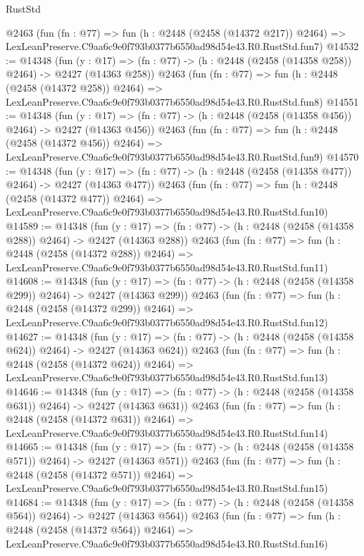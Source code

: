 \begin{lexlean}{RustStd}
\begin{coremodule}
    @2463
    (fun (fn : @77) =>
    fun (h : @2448 (@2458 (@14372 @217)) @2464) =>
    LexLeanPreserve.C9aa6c9e0f793b0377b6550ad98d54e43.R0.RustStd.fun7)
@14532 := @14348
    (fun (y : @17) => (fn : @77) -> (h : @2448 (@2458 (@14358 @258)) @2464) -> @2427 (@14363 @258))
    @2463
    (fun (fn : @77) =>
    fun (h : @2448 (@2458 (@14372 @258)) @2464) =>
    LexLeanPreserve.C9aa6c9e0f793b0377b6550ad98d54e43.R0.RustStd.fun8)
@14551 := @14348
    (fun (y : @17) => (fn : @77) -> (h : @2448 (@2458 (@14358 @456)) @2464) -> @2427 (@14363 @456))
    @2463
    (fun (fn : @77) =>
    fun (h : @2448 (@2458 (@14372 @456)) @2464) =>
    LexLeanPreserve.C9aa6c9e0f793b0377b6550ad98d54e43.R0.RustStd.fun9)
@14570 := @14348
    (fun (y : @17) => (fn : @77) -> (h : @2448 (@2458 (@14358 @477)) @2464) -> @2427 (@14363 @477))
    @2463
    (fun (fn : @77) =>
    fun (h : @2448 (@2458 (@14372 @477)) @2464) =>
    LexLeanPreserve.C9aa6c9e0f793b0377b6550ad98d54e43.R0.RustStd.fun10)
@14589 := @14348
    (fun (y : @17) => (fn : @77) -> (h : @2448 (@2458 (@14358 @288)) @2464) -> @2427 (@14363 @288))
    @2463
    (fun (fn : @77) =>
    fun (h : @2448 (@2458 (@14372 @288)) @2464) =>
    LexLeanPreserve.C9aa6c9e0f793b0377b6550ad98d54e43.R0.RustStd.fun11)
@14608 := @14348
    (fun (y : @17) => (fn : @77) -> (h : @2448 (@2458 (@14358 @299)) @2464) -> @2427 (@14363 @299))
    @2463
    (fun (fn : @77) =>
    fun (h : @2448 (@2458 (@14372 @299)) @2464) =>
    LexLeanPreserve.C9aa6c9e0f793b0377b6550ad98d54e43.R0.RustStd.fun12)
@14627 := @14348
    (fun (y : @17) => (fn : @77) -> (h : @2448 (@2458 (@14358 @624)) @2464) -> @2427 (@14363 @624))
    @2463
    (fun (fn : @77) =>
    fun (h : @2448 (@2458 (@14372 @624)) @2464) =>
    LexLeanPreserve.C9aa6c9e0f793b0377b6550ad98d54e43.R0.RustStd.fun13)
@14646 := @14348
    (fun (y : @17) => (fn : @77) -> (h : @2448 (@2458 (@14358 @631)) @2464) -> @2427 (@14363 @631))
    @2463
    (fun (fn : @77) =>
    fun (h : @2448 (@2458 (@14372 @631)) @2464) =>
    LexLeanPreserve.C9aa6c9e0f793b0377b6550ad98d54e43.R0.RustStd.fun14)
@14665 := @14348
    (fun (y : @17) => (fn : @77) -> (h : @2448 (@2458 (@14358 @571)) @2464) -> @2427 (@14363 @571))
    @2463
    (fun (fn : @77) =>
    fun (h : @2448 (@2458 (@14372 @571)) @2464) =>
    LexLeanPreserve.C9aa6c9e0f793b0377b6550ad98d54e43.R0.RustStd.fun15)
@14684 := @14348
    (fun (y : @17) => (fn : @77) -> (h : @2448 (@2458 (@14358 @564)) @2464) -> @2427 (@14363 @564))
    @2463
    (fun (fn : @77) =>
    fun (h : @2448 (@2458 (@14372 @564)) @2464) =>
    LexLeanPreserve.C9aa6c9e0f793b0377b6550ad98d54e43.R0.RustStd.fun16)

\end{coremodule}
\end{lexlean}
